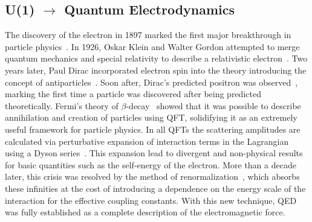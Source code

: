 \subsection{U(1) \texorpdfstring{$\rightarrow$}{-} Quantum Electrodynamics}

The discovery of the electron in 1897 marked the first major breakthrough in particle physics~\cite{ThomsonElectron}.
In 1926, Oskar Klein and Walter Gordon attempted to merge quantum mechanics and special relativity to describe a relativistic electron~\cite{Klein1926,Gordon1926}.
Two years later, Paul Dirac incorporated electron spin into the theory introducing the concept of antiparticles~\cite{Dirac1928}.
Soon after, Dirac's predicted positron was observed~\cite{PositiveElectron}, marking the first time a particle was discovered after being predicted theoretically.
Fermi's theory of $\beta$-decay~\cite{Fermi1934} showed that it was possible to describe annihilation and creation of particles using \Gls{QFT}\@, solidifying it as an extremely useful framework for particle physics.
In all QFTs the scattering amplitudes are calculated via perturbative expansion of interaction terms in the Lagrangian using a Dyson series~\cite{AlexQED4}.
This expansion lead to divergent and non-physical results for basic quantities such as the self-energy of the electron.
More than a decade later, this crisis was resolved by the method of renormalization~\cite{Renorm1,Renorm2,Renorm3,Renorm4,Renorm5,Renorm6,Renorm7,Renorm8,Renorm9,Renorm10,Renorm11,Renorm12}, which absorbs these infinities at the cost of introducing a dependence on the energy scale of the interaction for the effective coupling constants.
With this new technique, \Gls{QED}~\cite{AlexQED1,AlexQED2,AlexQED3} was fully established as a complete description of the electromagnetic force.

